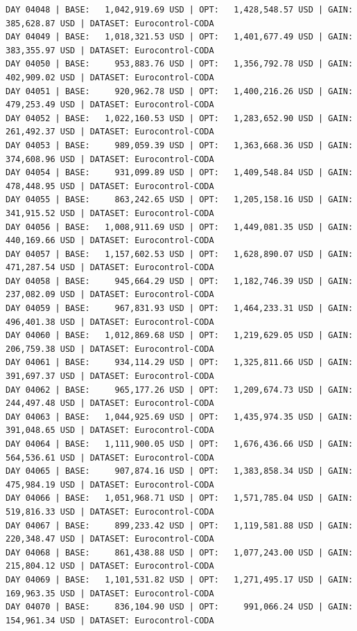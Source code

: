 \documentclass[11pt,a4paper]{article}
\begin{document}
\begin{verbatim}
DAY 04048 | BASE:   1,042,919.69 USD | OPT:   1,428,548.57 USD | GAIN: 385,628.87 USD | DATASET: Eurocontrol-CODA
DAY 04049 | BASE:   1,018,321.53 USD | OPT:   1,401,677.49 USD | GAIN: 383,355.97 USD | DATASET: Eurocontrol-CODA
DAY 04050 | BASE:     953,883.76 USD | OPT:   1,356,792.78 USD | GAIN: 402,909.02 USD | DATASET: Eurocontrol-CODA
DAY 04051 | BASE:     920,962.78 USD | OPT:   1,400,216.26 USD | GAIN: 479,253.49 USD | DATASET: Eurocontrol-CODA
DAY 04052 | BASE:   1,022,160.53 USD | OPT:   1,283,652.90 USD | GAIN: 261,492.37 USD | DATASET: Eurocontrol-CODA
DAY 04053 | BASE:     989,059.39 USD | OPT:   1,363,668.36 USD | GAIN: 374,608.96 USD | DATASET: Eurocontrol-CODA
DAY 04054 | BASE:     931,099.89 USD | OPT:   1,409,548.84 USD | GAIN: 478,448.95 USD | DATASET: Eurocontrol-CODA
DAY 04055 | BASE:     863,242.65 USD | OPT:   1,205,158.16 USD | GAIN: 341,915.52 USD | DATASET: Eurocontrol-CODA
DAY 04056 | BASE:   1,008,911.69 USD | OPT:   1,449,081.35 USD | GAIN: 440,169.66 USD | DATASET: Eurocontrol-CODA
DAY 04057 | BASE:   1,157,602.53 USD | OPT:   1,628,890.07 USD | GAIN: 471,287.54 USD | DATASET: Eurocontrol-CODA
DAY 04058 | BASE:     945,664.29 USD | OPT:   1,182,746.39 USD | GAIN: 237,082.09 USD | DATASET: Eurocontrol-CODA
DAY 04059 | BASE:     967,831.93 USD | OPT:   1,464,233.31 USD | GAIN: 496,401.38 USD | DATASET: Eurocontrol-CODA
DAY 04060 | BASE:   1,012,869.68 USD | OPT:   1,219,629.05 USD | GAIN: 206,759.38 USD | DATASET: Eurocontrol-CODA
DAY 04061 | BASE:     934,114.29 USD | OPT:   1,325,811.66 USD | GAIN: 391,697.37 USD | DATASET: Eurocontrol-CODA
DAY 04062 | BASE:     965,177.26 USD | OPT:   1,209,674.73 USD | GAIN: 244,497.48 USD | DATASET: Eurocontrol-CODA
DAY 04063 | BASE:   1,044,925.69 USD | OPT:   1,435,974.35 USD | GAIN: 391,048.65 USD | DATASET: Eurocontrol-CODA
DAY 04064 | BASE:   1,111,900.05 USD | OPT:   1,676,436.66 USD | GAIN: 564,536.61 USD | DATASET: Eurocontrol-CODA
DAY 04065 | BASE:     907,874.16 USD | OPT:   1,383,858.34 USD | GAIN: 475,984.19 USD | DATASET: Eurocontrol-CODA
DAY 04066 | BASE:   1,051,968.71 USD | OPT:   1,571,785.04 USD | GAIN: 519,816.33 USD | DATASET: Eurocontrol-CODA
DAY 04067 | BASE:     899,233.42 USD | OPT:   1,119,581.88 USD | GAIN: 220,348.47 USD | DATASET: Eurocontrol-CODA
DAY 04068 | BASE:     861,438.88 USD | OPT:   1,077,243.00 USD | GAIN: 215,804.12 USD | DATASET: Eurocontrol-CODA
DAY 04069 | BASE:   1,101,531.82 USD | OPT:   1,271,495.17 USD | GAIN: 169,963.35 USD | DATASET: Eurocontrol-CODA
DAY 04070 | BASE:     836,104.90 USD | OPT:     991,066.24 USD | GAIN: 154,961.34 USD | DATASET: Eurocontrol-CODA

\end{verbatim}
\end{document}
